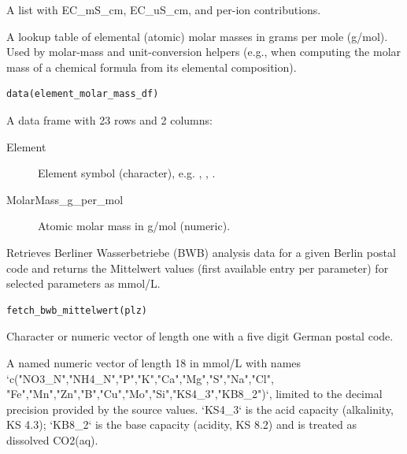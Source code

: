 \documentclass[a4paper]{book}
\begin{document}
%
\begin{Value}
A list with EC\_mS\_cm, EC\_uS\_cm, and per-ion contributions.
\end{Value}
%
\begin{Description}
A lookup table of elemental (atomic) molar masses in grams per mole (g/mol).
Used by molar-mass and unit-conversion helpers (e.g., when computing the molar
mass of a chemical formula from its elemental composition).
\end{Description}
%
\begin{Usage}
\begin{verbatim}
data(element_molar_mass_df)
\end{verbatim}
\end{Usage}
%
\begin{Format}
A data frame with 23 rows and 2 columns:
\begin{description}

\item[Element] Element symbol (character), e.g. , , .
\item[MolarMass\_g\_per\_mol] Atomic molar mass in g/mol (numeric).

\end{description}

\end{Format}
%
\begin{Description}
Retrieves Berliner Wasserbetriebe (BWB) analysis data for a given Berlin
postal code and returns the Mittelwert values (first available entry per
parameter) for selected parameters as mmol/L.
\end{Description}
%
\begin{Usage}
\begin{verbatim}
fetch_bwb_mittelwert(plz)
\end{verbatim}
\end{Usage}
%
\begin{Arguments}
\begin{ldescription}
\item[\code{plz}] Character or numeric vector of length one with a five digit
German postal code.
\end{ldescription}
\end{Arguments}
%
\begin{Value}
A named numeric vector of length 18 in mmol/L with names
`c("NO3\_N","NH4\_N","P","K","Ca","Mg","S","Na","Cl",
"Fe","Mn","Zn","B","Cu","Mo","Si","KS4\_3","KB8\_2")`, limited to the decimal precision
provided by the source values. `KS4\_3` is the acid capacity (alkalinity, KS 4.3);
`KB8\_2` is the base capacity (acidity, KS 8.2) and is treated as dissolved CO2(aq).
\end{Value}
\end{document}
